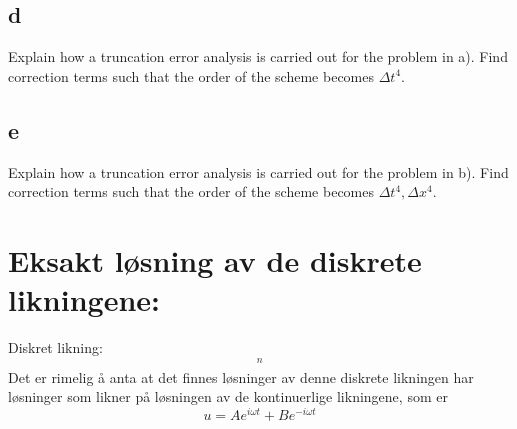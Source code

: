 \documentclass[a4paper, 10pt]{article}
\begin{document}
\subsection{d} 
Explain how a truncation error analysis is carried out for the problem in a). Find correction terms such that the order of the scheme becomes $\Delta t^4$.

\subsection{e} 
Explain how a truncation error analysis is carried out for the problem in b). Find correction terms such that the order of the scheme becomes $\Delta t^4,\Delta x^4$.

\section{Eksakt løsning av de diskrete likningene:}
Diskret likning:
\begin{equation}
	[D_t D_t u +\omega^2 u = 0 ]^n
\end{equation}
Det er rimelig å anta at det finnes løsninger av denne diskrete likningen har løsninger som likner på løsningen av de kontinuerlige likningene, som er   
\begin{equation}
	u = Ae^{i\omega t} + Be^{-i\omega t}
\end{equation}
\end{document}
